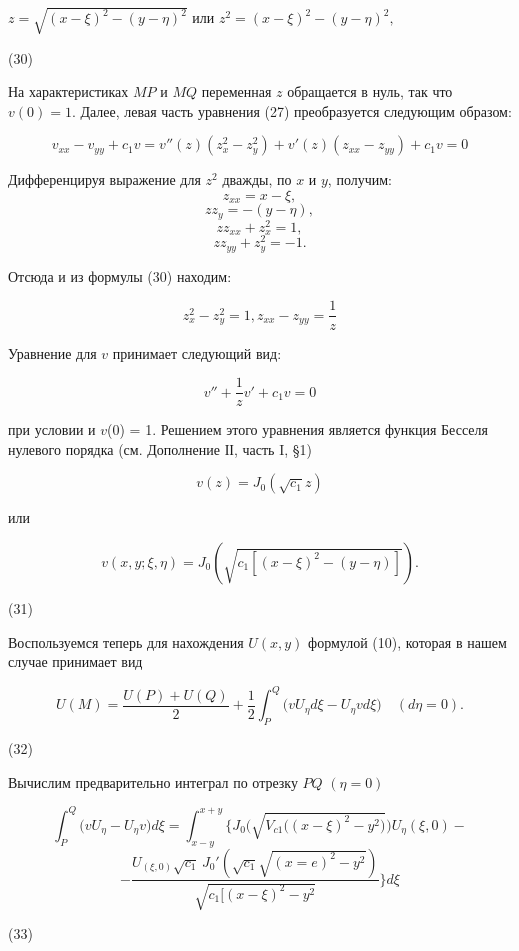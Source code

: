 \documentclass{article}
\begin{document}
$z=\sqrt{(x-\xi)^2-(y-\eta)^2}$ или $z^2=(x-\xi)^2-(y-\eta)^2,$
\begin{flushright}
    (30)
\end{flushright}

На характеристиках $MP$ и $MQ$ переменная $z$ обращается в нуль, так что $v(0)=1$. Далее, левая часть уравнения (27) преобразуется следующим образом:

\[
v_{x x}-v_{y y}+c_1v=v''(z)(z^2_x-z^2_y)+v'(z)(z_{x x}-z_{y y})+c_1v=0\]

Дифференцируя выражение для $z^2$ дважды, по $x$ и $y$, получим:
\[z_{xx}=x-\xi,\]
\[zz_y=-(y-\eta),\]
\[zz_{x x}+z^2_x=1,\]
\[zz_{yy}+z^2_y=-1.\]

Отсюда и из формулы (30) находим:

\[z^2_x-z^2_y=1,z_{xx}-z_{yy}=\frac{1}{z}\]

Уравнение для $v$ принимает следующий вид:

\[v''+\frac{1}{z}v'+c_1v=0\]


\maketitle{}
\par
при условии и $v$(0) = 1. Решением этого уравнения является функция Бесселя нулевого порядка (см. Дополнение ІІ, часть I,  §1)

\[v(z)=J_0(\sqrt{c_1}z)\]

или

\[v(x,y;\xi,\eta)=J_0(\sqrt{c_1[(x-\xi)^2-(y-\eta)]}).\]
\begin{flushright}
    (31)
\end{flushright}
Воспользуемся теперь для нахождения $U$$(x,y)$ формулой (10), которая в нашем случае принимает вид 


\[U(M) = \frac{U(P) + U(Q)}{2} + \frac{1}{2} \int_P^Q \big(vU_\eta d\xi - U_\eta vd\xi \big) \quad (d\eta = 0).\]
\begin{flushright}
    (32)
\end{flushright}

Вычислим предварительно интеграл по отрезку $PQ$ $(\eta=0)$


\[\int_P^Q \big(vU_\eta - U_\eta v \big)d\xi = \int_{x-y}^{x+y} \bigg\{ J_0 \big( \sqrt{V_{c1} \big((x - \xi)^2 - y^2\big)} \big) U_\eta (\xi, 0) -\]
\[-\frac{U_{(\xi, 0)} \sqrt{c_1} \, J_0'(\sqrt{c_1}\sqrt{(x=e)^2-y^2})}{\sqrt{c_1\big[(x - \xi)^2 - y^2}} \bigg\} d\xi\] 
\begin{flushright}
    (33)
\end{flushright}
\end{document}
